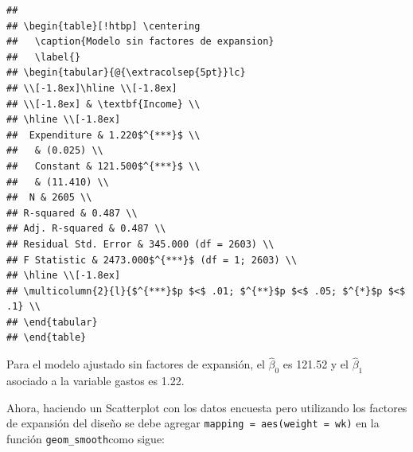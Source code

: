 \documentclass[
  12pt,
]{book}
\begin{document}
\begin{verbatim}
## 
## \begin{table}[!htbp] \centering 
##   \caption{Modelo sin factores de expansion} 
##   \label{} 
## \begin{tabular}{@{\extracolsep{5pt}}lc} 
## \\[-1.8ex]\hline \\[-1.8ex] 
## \\[-1.8ex] & \textbf{Income} \\ 
## \hline \\[-1.8ex] 
##  Expenditure & 1.220$^{***}$ \\ 
##   & (0.025) \\ 
##   Constant & 121.500$^{***}$ \\ 
##   & (11.410) \\ 
##  N & 2605 \\ 
## R-squared & 0.487 \\ 
## Adj. R-squared & 0.487 \\ 
## Residual Std. Error & 345.000 (df = 2603) \\ 
## F Statistic & 2473.000$^{***}$ (df = 1; 2603) \\ 
## \hline \\[-1.8ex] 
## \multicolumn{2}{l}{$^{***}$p $<$ .01; $^{**}$p $<$ .05; $^{*}$p $<$ .1} \\ 
## \end{tabular} 
## \end{table}
\end{verbatim}

Para el modelo ajustado sin factores de expansión, el \(\hat{\beta}_{0}\) es 121.52 y el \(\hat{\beta}_{1}\) asociado a la variable gastos es 1.22.

Ahora, haciendo un Scatterplot con los datos encuesta pero utilizando los factores de expansión del diseño se debe agregar \texttt{mapping\ =\ aes(weight\ =\ wk)} en la función \texttt{geom\_smooth}como sigue:
\end{document}
